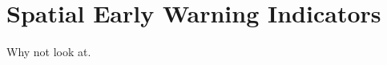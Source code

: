 \chapter{Spatial Early Warning Indicators}
\graphicspath{{spatial_ews/figs/}}
Why not look at\cite{jame76}.